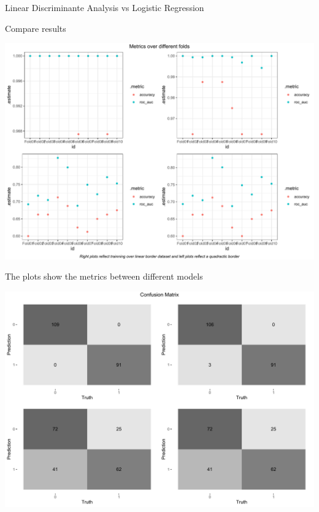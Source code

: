 \documentclass[
  ignorenonframetext,
]{article}
\begin{document}
\begin{frame}[fragile]{Linear Discriminante Analysis vs Logistic Regression}
\begin{block}{Compare results}
\begin{center}\includegraphics{_main_files/figure-beamer/unnamed-chunk-47-1} \end{center}

The plots show the metrics between different models

\begin{center}\includegraphics{_main_files/figure-beamer/unnamed-chunk-48-1} \end{center}


\end{block}
\end{frame}
\end{document}
